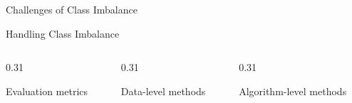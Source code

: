 \begin{frame}[plain]
\end{frame}

\begin{frame}[plain]
\end{frame}

\begin{frame}[plain]
\end{frame}

\iffalse
\begin{frame}{Challenges of Class Imbalance}
  \begin{withmargin}
    \begin{tdmain}
    \end{tdmain}
    \begin{tdmargin}
    \end{tdmargin}
  \end{withmargin}
  \begin{takeaway}
  \end{takeaway}
\end{frame}

\begin{frame}{Handling Class Imbalance}
  \begin{columns}[T,onlytextwidth]
    \begin{column}{0.31\textwidth}
      \begin{tdblockt}[equal height group=hci]{Evaluation metrics}
      \end{tdblockt}
    \end{column}
    \begin{column}{0.31\textwidth}
      \begin{tdblockt}[equal height group=hci]{Data-level methods}
      \end{tdblockt}
    \end{column}
    \begin{column}{0.31\textwidth}
      \begin{tdblockt}[equal height group=hci]{Algorithm-level methods}
      \end{tdblockt}
    \end{column}
  \end{columns}
\end{frame}

